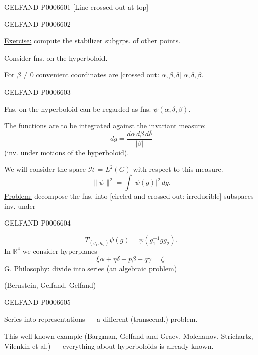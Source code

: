 \begin{GelfandAdjacentEvidence}{GELFAND-P000660}{1}
[Line crossed out at top]
\end{GelfandAdjacentEvidence}
\begin{GelfandAdjacentEvidence}{GELFAND-P000660}{2}


\underline{Exercise:} compute the stabilizer subgrps. of other points.

Consider fns. on the hyperboloid.

For \(\beta\ne0\) convenient coordinates are [crossed out: \(\alpha,\beta,\delta\)]
\(\alpha,\delta,\beta\).
\end{GelfandAdjacentEvidence}
\begin{GelfandAdjacentEvidence}{GELFAND-P000660}{3}


Fns. on the hyperboloid can be regarded as fns. \(\psi(\alpha,\delta,\beta)\).

The functions are to be integrated against the invariant measure:
\[
dg=\frac{d\alpha\,d\beta\,d\delta}{|\beta|}
\]
(inv. under motions of the hyperboloid).

We will consider the space \(\mathcal H=L^2(G)\) with respect to this measure.
\[
\|\psi\|^2=\int|\psi(g)|^2\,dg.
\]
\underline{Problem:} decompose the fns. into [circled and crossed out: irreducible]
subspaces inv. under
\end{GelfandAdjacentEvidence}
\begin{GelfandAdjacentEvidence}{GELFAND-P000660}{4}

\[
T_{(g_1,g_2)}\psi(g)=\psi(g_1^{-1}gg_2).
\]
In \(\mathbb R^4\) we consider hyperplanes
\[
\xi\alpha+\eta\delta-p\beta-q\gamma=\zeta.
\]
G. \underline{Philosophy:} divide into \underline{series} (an algebraic problem)

(Bernstein, Gelfand, Gelfand)
\end{GelfandAdjacentEvidence}
\begin{GelfandAdjacentEvidence}{GELFAND-P000660}{5}


Series into representations --- a different (transcend.) problem.

This well-known example (Bargman, Gelfand and Graev, Molchanov, Strichartz, Vilenkin
et al.) --- everything about hyperboloids is already known.
\end{GelfandAdjacentEvidence}
